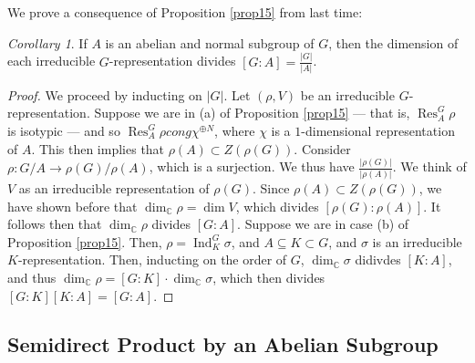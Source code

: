 \documentclass[a4paper]{report}
\theoremstyle{definition}
\theoremstyle{remark}
\theoremstyle{proposition}
\theoremstyle{conjecture}
\theoremstyle{lemma}
\theoremstyle{corollary}
\newtheorem{corollary}{Corollary}
\theoremstyle{exercise}
\theoremstyle{example}
\newcommand{\C}{\mathbb{C}}
\newcommand{\on}{\operatorname}
\begin{document}
We prove a consequence of Proposition \ref{prop15} from last time:
\begin{corollary}
    If $A$ is an abelian and normal subgroup of $G$, then 
    the dimension of each irreducible $G$-representation divides 
    $[G:A] = \frac{\vert G\vert}{\vert A \vert}$.
\end{corollary}

\begin{proof}
    We proceed by inducting on $\vert G\vert$. Let $(\rho,V)$ be an irreducible
    $G$-representation.
    Suppose we are in (a) of Proposition \ref{prop15} --- that is, 
    $\on{Res}_A^G\rho$ is isotypic --- and so 
    $\on{Res}_A^G\rho cong \chi^{\oplus N}$, where $\chi$ is a 
    $1$-dimensional representation of $A$. This then implies that 
    $\rho(A)\subset Z(\rho(G))$. Consider $\rho : G/A \to \rho(G)/\rho(A)$,
    which is a surjection.
    We thus have $\frac{\vert \rho(G)\vert}{\vert \rho(A)\vert}$.
    We think of $V$ as an irreducible representation of $\rho(G)$.
    Since $\rho(A)\subset Z(\rho(G))$, we have shown before that 
    $\dim_\C \rho = \dim V$, which divides 
    $[\rho(G):\rho(A)]$. It follows then that $\dim_\C\rho$ divides
    $[G:A]$. Suppose we are in case (b) of Proposition \ref{prop15}.
    Then, $\rho = \on{Ind}_K^G\sigma$, and $A\subseteq K \subset G$,
    and $\sigma$ is an irreducible $K$-representation. Then, inducting on 
    the order of $G$, $\dim_\C\sigma$ didivdes $[K:A]$, and thus 
    $\dim_\C\rho = [G:K] \cdot \dim_\C \sigma$, which then divides
    $[G:K][K:A] = [G:A]$.
\end{proof}

\subsection{Semidirect Product by an Abelian Subgroup}
\end{document}
